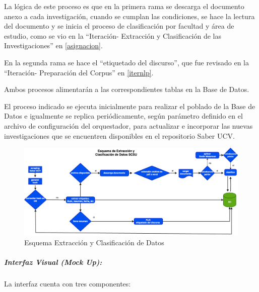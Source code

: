 \documentclass[
  12pt,
  openany]{book}
\begin{document}
La lógica de este proceso es que en la primera rama se descarga el documento anexo a cada investigación, cuando se cumplan las condiciones, se hace la lectura del documento y se inicia el proceso de clasificación por facultad y área de estudio, como se vio en la ``Iteración- Extracción y Clasificación de las Investigaciones'' en \ref{asignacion}.

En la segunda rama se hace el ``etiquetado del discurso'', que fue revisado en la ``Iteración- Preparación del Corpus'' en \ref{iternlp}.

Ambos procesos alimentarán a las correspondientes tablas en la Base de Datos.

El proceso indicado se ejecuta inicialmente para realizar el poblado de la Base de Datos e igualmente se replica periódicamente, según parámetro definido en el archivo de configuración del orquestador, para actualizar e incorporar las nuevas investigaciones que se encuentren disponibles en el repositorio Saber UCV.

\begin{figure}

{\centering \includegraphics[width=0.9\linewidth]{images/05-desarrollo/4_ciclo/esquema extraccion} 

}

\caption{Esquema Extracción y Clasificación de Datos}\label{fig:diagramaextra}
\end{figure}

\hypertarget{interfaz-visual-mock-up}{%
\subparagraph{Interfaz Visual (Mock Up):}\label{interfaz-visual-mock-up}}

La interfaz cuenta con tres componentes:
\end{document}
